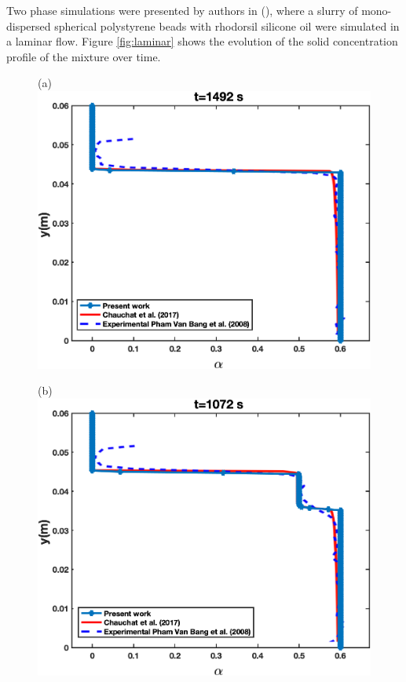 \documentclass[11pt]{report}
\begin{document}
\begin{minipage}[t]{0.35\textwidth}
\begin{minipage}[t]{0.5\textwidth}
\begin{minipage}[t]{0.35\textwidth}
\begin{minipage}[t]{0.35\textwidth}
 \begin{center}
 \end{center}
 Two phase simulations were presented by authors in (\citet{elkarii2020towards}), where a slurry of mono-dispersed spherical polystyrene beads with rhodorsil silicone oil were simulated in a laminar flow. 
 Figure \ref{fig:laminar} shows the evolution of the solid concentration profile of the mixture over time.\\
\begin{figure}[ht!]
 \begin{center}
 (a)\includegraphics[scale = 0.45]{figs/E4}
 \end{center}
 \end{figure}
%
 \begin{figure}[ht!]
 \begin{center}
 (b)\includegraphics[scale = 0.45]{figs/E3}

\end{center}
\end{figure}
\end{minipage}
\end{minipage}
\end{minipage}
\end{minipage}
\end{document}
